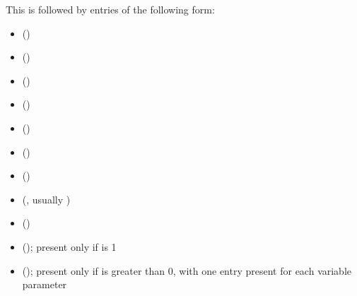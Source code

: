 \documentclass[letterpaper,10pt,english]{sphinxmanual}
\begin{document}
This is followed by  entries of the following form:
\begin{itemize}
\item {} 
 ()

\item {} 
 ()

\item {} 
 ()

\item {} 
 ()

\item {} 
 ()

\item {} 
 ()

\item {} 
 ()

\item {} 
 (, usually )

\item {} 
 ()

\item {} 
 (); present only if  is 1

\item {} 
 (); present only if  is greater than 0, with one entry present for each variable parameter 

\end{itemize}
\end{document}
